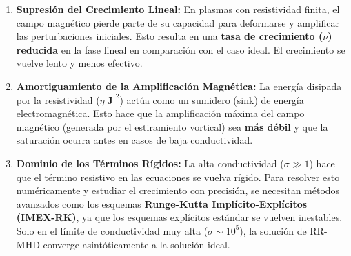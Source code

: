 \begin{enumerate}
    \item \textbf{Supresión del Crecimiento Lineal:} En plasmas con resistividad finita, el campo magnético pierde parte de su capacidad para deformarse y amplificar las perturbaciones iniciales. Esto resulta en una \textbf{tasa de crecimiento ($\nu$) reducida} en la fase lineal en comparación con el caso ideal. El crecimiento se vuelve lento y menos efectivo.
    \item \textbf{Amortiguamiento de la Amplificación Magnética:} La energía disipada por la resistividad ($\eta |\mathbf{J}|^2$) actúa como un sumidero (sink) de energía electromagnética. Esto hace que la amplificación máxima del campo magnético (generada por el estiramiento vortical) sea \textbf{más débil} y que la saturación ocurra antes en casos de baja conductividad.
    \item \textbf{Dominio de los Términos Rígidos:} La alta conductividad ($\sigma \gg 1$) hace que el término resistivo en las ecuaciones se vuelva rígido. Para resolver esto numéricamente y estudiar el crecimiento con precisión, se necesitan métodos avanzados como los esquemas \textbf{Runge-Kutta Implícito-Explícitos (IMEX-RK)}, ya que los esquemas explícitos estándar se vuelven inestables. Solo en el límite de conductividad muy alta ($\sigma \sim 10^5$), la solución de RR-MHD converge asintóticamente a la solución ideal.
\end{enumerate}




